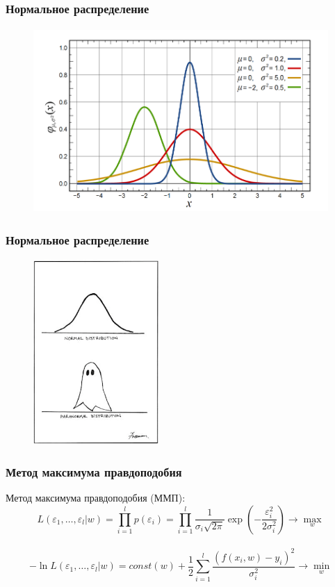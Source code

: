 \documentclass[10pt]{beamer}
\begin{document}
\begin{frame}\frametitle{Нормальное распределение}
\begin{figure}[htbp]
  \includegraphics[height=200pt, keepaspectratio = true]{images/gauss}   
\end{figure}
\end{frame}

\begin{frame}\frametitle{Нормальное распределение}
\begin{figure}[htbp]
  \includegraphics[height=200pt, keepaspectratio = true]{images/paranormal}   
\end{figure}
\end{frame}


\begin{frame}\frametitle{Метод максимума правдоподобия}
Метод максимума правдоподобия (ММП):\\
$$L(\varepsilon_1, \dots, \varepsilon_l | w) = \prod\limits_{i=1}^l p(\varepsilon_i) = \prod\limits_{i=1}^l \frac{1}{\sigma_i \sqrt{2\pi}} \exp (-\frac{\varepsilon_i^2}{2\sigma_i^2}  ) \rightarrow \max\limits_{w}$$\\
$$- \ln L(\varepsilon_1, \dots, \varepsilon_l| w) = const(w) + \frac{1}{2} \sum\limits_{i=1}^l \frac{(f(x_i, w) - y_i)^2}{\sigma_i^2}  \rightarrow \min\limits_{w}$$\\
\end{frame}
\end{document}
